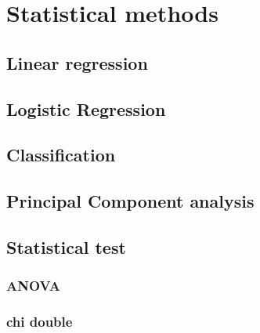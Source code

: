 \chapter{Statistical methods}
\label{sec: statistical }
\section{Linear regression}
\section{Logistic Regression}
\section{Classification}

\section{Principal Component analysis}

\section{Statistical test}

\subsection{ANOVA}

\subsection{ chi double}

